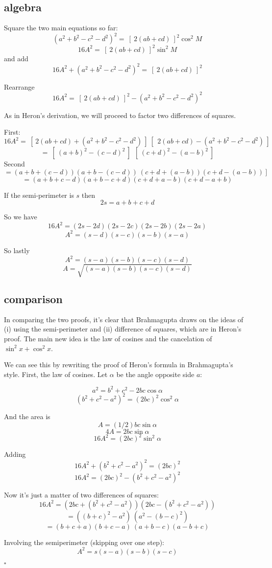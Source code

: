 \documentclass[11pt, oneside]{article}
\begin{document}
\subsection*{algebra}

Square the two main equations so far:
\[ (a^2 + b^2 - c^2 - d^2)^2 =  \ [ \ 2(ab + cd) \ ]^2 \cos^2 M \]
\[ 16A^2 =  \ [ \ 2(ab + cd) \ ]^2 \sin^2 M \]
and add
\[ 16A^2 + (a^2 + b^2 - c^2 - d^2)^2 =   \ [ \ 2(ab + cd) \ ]^2 \]

Rearrange
\[ 16A^2 =   \ [ \ 2(ab + cd) \ ]^2 - (a^2 + b^2 - c^2 - d^2)^2 \]

As in Heron's derivation, we will proceed to factor two differences of squares.  

First:
\[ 16A^2 =   \ [ \ 2(ab + cd) + (a^2 + b^2 - c^2 - d^2) \ ] \ [ \ \ 2(ab + cd) - (a^2 + b^2 - c^2 - d^2) \ ] \]
\[ = \ [ \ (a + b)^2 - (c - d)^2 \ ] \  \ [ \ (c + d)^2 - (a - b)^2 \ ] \]
Second
\[ = (a + b + (c - d))(a + b - (c - d)) \ (c + d + (a - b))(c + d - (a - b)) \ ] \]
\[ = (a + b + c - d)(a + b - c + d)(c + d + a - b)(c + d - a + b) \]

If the semi-perimeter is $s$ then
\[ 2s = a + b + c + d \]

So we have
\[ 16A^2 = (2s - 2d)(2s - 2c)(2s - 2b)(2s - 2a) \]
\[ A^2 = (s - d)(s - c)(s - b)(s - a) \]

So lastly
\[ A^2 = (s - a)(s - b)(s - c)(s - d) \]
\[ A = \sqrt{(s - a)(s - b)(s - c)(s - d)} \]

\subsection*{comparison}

In comparing the two proofs, it's clear that Brahmagupta draws on the ideas of (i) using the semi-perimeter and (ii) difference of squares, which are in Heron's proof.  The main new idea is the law of cosines and the cancelation of $\sin^2 x + \cos^2 x$.

We can see this by rewriting the proof of Heron's formula in Brahmagupta's style.  First, the law of cosines.  Let $\alpha$ be the angle opposite side $a$:

\[ a^2 = b^2 + c^2 - 2bc \cos \alpha \]
\[ (b^2 + c^2 - a^2)^2 = (2bc)^2 \cos^2 \alpha \]

And the area is
\[ A = (1/2) bc \sin \alpha \]
\[ 4A = 2bc \sin \alpha \]
\[ 16A^2 = (2bc)^2 \sin^2 \alpha \]

Adding
\[ 16A^2 + (b^2 + c^2 - a^2)^2 = (2bc)^2  \]
\[ 16A^2 = (2bc)^2 - (b^2 + c^2 - a^2)^2  \]

Now it's just a matter of two differences of squares:
\[ 16A^2 = (2bc + (b^2 + c^2 - a^2))(2bc - (b^2 + c^2 - a^2)) \]
\[ = ((b + c)^2 - a^2) \ (a^2 - (b - c)^2) \]
\[ = (b + c + a)(b + c - a) \ (a + b - c)(a - b + c) \]

Involving the semiperimeter (skipping over one step):
\[ A^2 = s(s - a)(s - b)(s - c) \]

$\square$
\end{document}
